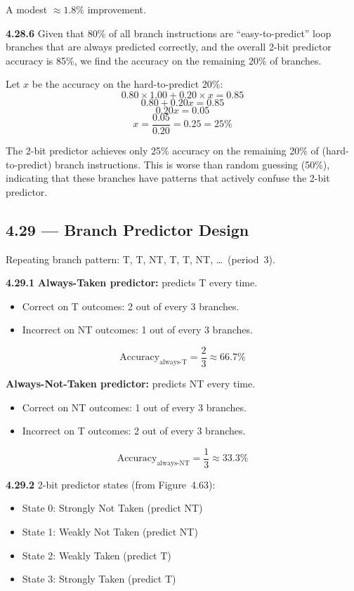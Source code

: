 A modest $\approx 1.8\%$ improvement.

\medskip\noindent\textbf{4.28.6}
Given that 80\% of all branch instructions are ``easy-to-predict'' loop
branches that are always predicted correctly, and the overall 2-bit predictor
accuracy is 85\%, we find the accuracy on the remaining 20\% of branches.

Let $x$ be the accuracy on the hard-to-predict 20\%:
\[
  0.80 \times 1.00 + 0.20 \times x = 0.85
\]
\[
  0.80 + 0.20x = 0.85
\]
\[
  0.20x = 0.05
\]
\[
  x = \frac{0.05}{0.20} = \boxed{0.25 = 25\%}
\]

The 2-bit predictor achieves only 25\% accuracy on the remaining 20\% of
(hard-to-predict) branch instructions. This is worse than random guessing
(50\%), indicating that these branches have patterns that actively confuse the
2-bit predictor.

\subsection*{4.29 --- Branch Predictor Design}
\hypertarget{sol-4.29}{}

Repeating branch pattern: T, T, NT, T, T, NT, \ldots\ (period~3).

\medskip\noindent\textbf{4.29.1}
\textbf{Always-Taken predictor:} predicts T every time.
\begin{itemize}
  \item Correct on T outcomes: 2 out of every 3 branches.
  \item Incorrect on NT outcomes: 1 out of every 3 branches.
\end{itemize}
\[
  \text{Accuracy}_{\text{always-T}} = \frac{2}{3} \approx \boxed{66.7\%}
\]

\textbf{Always-Not-Taken predictor:} predicts NT every time.
\begin{itemize}
  \item Correct on NT outcomes: 1 out of every 3 branches.
  \item Incorrect on T outcomes: 2 out of every 3 branches.
\end{itemize}
\[
  \text{Accuracy}_{\text{always-NT}} = \frac{1}{3} \approx \boxed{33.3\%}
\]

\medskip\noindent\textbf{4.29.2}
2-bit predictor states (from Figure~4.63):
\begin{itemize}
  \item State 0: Strongly Not Taken (predict NT)
  \item State 1: Weakly Not Taken (predict NT)
  \item State 2: Weakly Taken (predict T)
  \item State 3: Strongly Taken (predict T)
\end{itemize}

